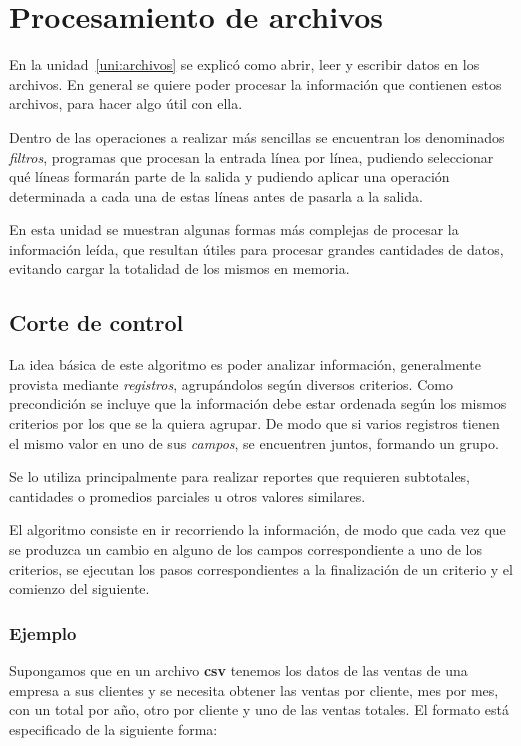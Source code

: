 \chapter{Procesamiento de archivos}

En la unidad~\ref{uni:archivos} se explicó como abrir, leer y escribir datos en
los archivos.  En general se quiere poder procesar la información que contienen
estos archivos, para hacer algo útil con ella.

Dentro de las operaciones a realizar más sencillas se encuentran los
denominados \emph{filtros}, programas que procesan la entrada línea por
línea, pudiendo seleccionar qué líneas formarán parte de la salida y
pudiendo aplicar una operación determinada a cada una de estas líneas antes
de pasarla a la salida.

En esta unidad se muestran algunas formas más complejas de procesar la
información leída, que resultan útiles para procesar grandes cantidades de
datos, evitando cargar la totalidad de los mismos en memoria.

\section{Corte de control}

La idea básica de este algoritmo es poder analizar información, generalmente
provista mediante \textit{registros}, agrupándolos según diversos criterios.
Como precondición se incluye que la información debe estar ordenada según
los mismos criterios por los que se la quiera agrupar. De modo que si
varios registros tienen el mismo valor en uno de sus \textit{campos}, se
encuentren juntos, formando un grupo.

Se lo utiliza principalmente para realizar reportes que requieren
subtotales, cantidades o promedios parciales u otros valores similares.

El algoritmo consiste en ir recorriendo la información, de modo que cada vez
que se produzca un cambio en alguno de los campos correspondiente a uno de los
criterios, se ejecutan los pasos correspondientes a la finalización de un
criterio y el comienzo del siguiente.

\subsection*{Ejemplo}

Supongamos que en un archivo \textbf{csv} tenemos los datos de las ventas de
una empresa a sus clientes y se necesita obtener las ventas por cliente,
mes por mes, con un total por año, otro por cliente y uno de las ventas
totales. El formato está especificado de la siguiente forma:

